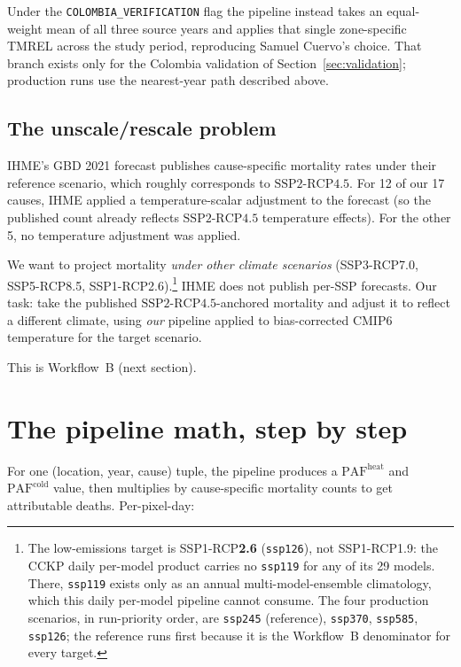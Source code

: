 \documentclass[11pt]{article}
\newcommand{\PAF}{\text{PAF}}
\newcommand{\SSPtwo}{\text{SSP2{-}RCP4.5}}
\begin{document}
Under the \texttt{COLOMBIA\_VERIFICATION} flag the pipeline instead takes
an equal-weight mean of all three source years and applies that single
zone-specific TMREL across the study period, reproducing Samuel Cuervo's
choice. That branch exists only for the Colombia validation of
Section~\ref{sec:validation}; production runs use the nearest-year path
described above.

\subsection{The unscale/rescale problem}

IHME's GBD 2021 forecast publishes cause-specific mortality rates under
their reference scenario, which roughly corresponds to $\SSPtwo$. For 12
of our 17 causes, IHME applied a temperature-scalar adjustment to the
forecast (so the published count already reflects $\SSPtwo$ temperature
effects). For the other 5, no temperature adjustment was applied.

We want to project mortality \emph{under other climate scenarios}
(SSP3-RCP7.0, SSP5-RCP8.5, SSP1-RCP2.6).\footnote{The low-emissions
target is SSP1-RCP\textbf{2.6} (\texttt{ssp126}), not SSP1-RCP1.9: the
CCKP daily per-model product carries no \texttt{ssp119} for any of its 29
models. There, \texttt{ssp119} exists only as an annual multi-model-ensemble
climatology, which this daily per-model pipeline cannot consume. The four
production scenarios, in run-priority order, are \texttt{ssp245}
(reference), \texttt{ssp370}, \texttt{ssp585}, \texttt{ssp126}; the
reference runs first because it is the Workflow~B denominator for every
target.} IHME does not publish per-SSP forecasts. Our task: take the published $\SSPtwo$-anchored mortality and
adjust it to reflect a different climate, using \emph{our} pipeline
applied to bias-corrected CMIP6 temperature for the target scenario.

This is Workflow~B (next section).

\section{The pipeline math, step by step}
\label{sec:pipeline-math}

For one (location, year, cause) tuple, the pipeline produces a
$\PAF^{\text{heat}}$ and $\PAF^{\text{cold}}$ value, then multiplies by
cause-specific mortality counts to get attributable deaths.
Per-pixel-day:
\end{document}
